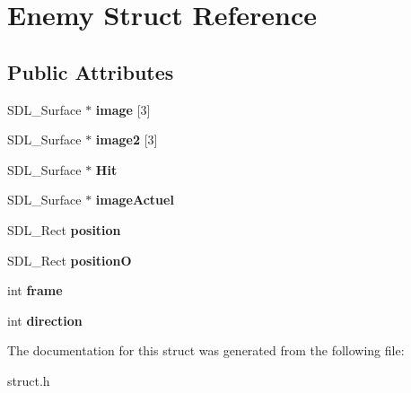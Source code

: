 \hypertarget{structEnemy}{}\section{Enemy Struct Reference}
\label{structEnemy}
\subsection*{Public Attributes}
\begin{DoxyCompactItemize}
\item 
\mbox{\label{structEnemy_afc1cf868e4b6602d2166ee9cfbf1d06e}} 
S\+D\+L\+\_\+\+Surface $\ast$ {\bfseries image} \mbox{[}3\mbox{]}
\item 
\mbox{\label{structEnemy_a43bdca7bc81657fccdb7d8cb7369f673}} 
S\+D\+L\+\_\+\+Surface $\ast$ {\bfseries image2} \mbox{[}3\mbox{]}
\item 
\mbox{\label{structEnemy_a62ed00c1aa4ac7bb90cb132c6c56b21d}} 
S\+D\+L\+\_\+\+Surface $\ast$ {\bfseries Hit}
\item 
\mbox{\label{structEnemy_ab8d7f9eceeef8f17331210f3f1fd2cf3}} 
S\+D\+L\+\_\+\+Surface $\ast$ {\bfseries image\+Actuel}
\item 
\mbox{\label{structEnemy_ac364f2ddf130c8622889deca0b6ba4d0}} 
S\+D\+L\+\_\+\+Rect {\bfseries position}
\item 
\mbox{\label{structEnemy_ab2e55fdee92a7689185599a67f726b41}} 
S\+D\+L\+\_\+\+Rect {\bfseries positionO}
\item 
\mbox{\label{structEnemy_a554574b1537da808a14f909b8a701735}} 
int {\bfseries frame}
\item 
\mbox{\label{structEnemy_a1de1605c4b41f74c3b0f4023258323ab}} 
int {\bfseries direction}
\end{DoxyCompactItemize}


The documentation for this struct was generated from the following file\+:\begin{DoxyCompactItemize}
\item 
struct.\+h\end{DoxyCompactItemize}
